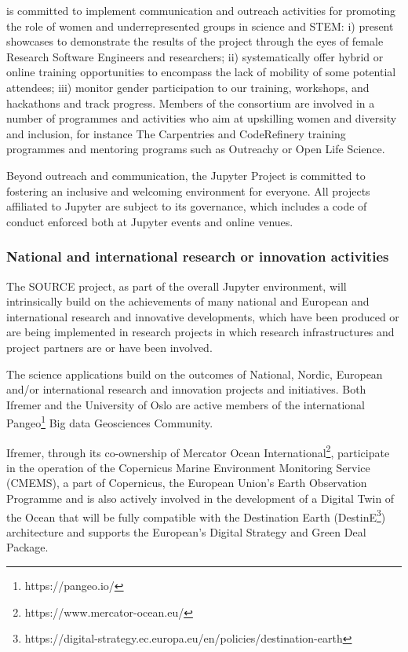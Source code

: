 \TheProject is committed to implement communication and outreach activities for
promoting the role of women and underrepresented groups in science
and STEM: i) present showcases to demonstrate the results of the project through
the eyes of female Research Software Engineers and researchers; ii)
systematically offer hybrid or online training opportunities to encompass the
lack of mobility of some potential attendees; iii) monitor gender participation
to our training, workshops, and hackathons and track progress. Members of the
consortium are involved in a number of programmes and activities who aim at
upskilling women and diversity and inclusion, for instance The Carpentries and
CodeRefinery training programmes and mentoring programs such as Outreachy or
Open Life Science.

Beyond outreach and communication, the Jupyter Project is committed to fostering an
inclusive and welcoming environment for everyone. All projects affiliated to
Jupyter are subject to its governance, which includes a code of conduct
enforced both at Jupyter events and online venues.

\subsubsection{National and international research or innovation activities}

\TOWRITE{}{}

The SOURCE project, as part of the overall Jupyter environment, will intrinsically build on the achievements of many
 national and European and international research and innovative developments, which have been produced or are 
 being implemented in research projects in which research infrastructures and project partners are or have been 
 involved.

The science applications build on the outcomes of National, Nordic, European and/or international research and 
innovation projects and initiatives. Both Ifremer and the University of Oslo are active members of the international 
Pangeo\footnote{https://pangeo.io/} Big data Geosciences Community.

Ifremer, through its co-ownership of Mercator Ocean International\footnote{https://www.mercator-ocean.eu/},
 participate in the operation of the Copernicus Marine Environment Monitoring Service (CMEMS), 
 a part of Copernicus, the European Union’s Earth Observation Programme and is also actively involved in the 
 development of a Digital Twin of the Ocean that will be fully compatible with the Destination Earth (DestinE\footnote{https://digital-strategy.ec.europa.eu/en/policies/destination-earth})
 architecture and supports the European's Digital Strategy and Green Deal Package.   

